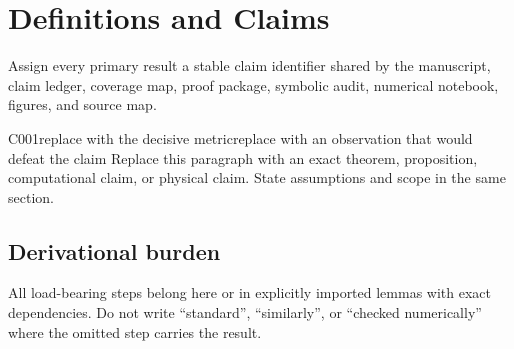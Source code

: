 \section{Definitions and Claims}

Assign every primary result a stable claim identifier shared by the manuscript, claim ledger, coverage map, proof package, symbolic audit, numerical notebook, figures, and source map.

\begin{claimblock}{C001}{replace with the decisive metric}{replace with an observation that would defeat the claim}
Replace this paragraph with an exact theorem, proposition, computational claim, or physical claim. State assumptions and scope in the same section.
\end{claimblock}

\subsection*{Derivational burden}

All load-bearing steps belong here or in explicitly imported lemmas with exact dependencies. Do not write ``standard'', ``similarly'', or ``checked numerically'' where the omitted step carries the result.
